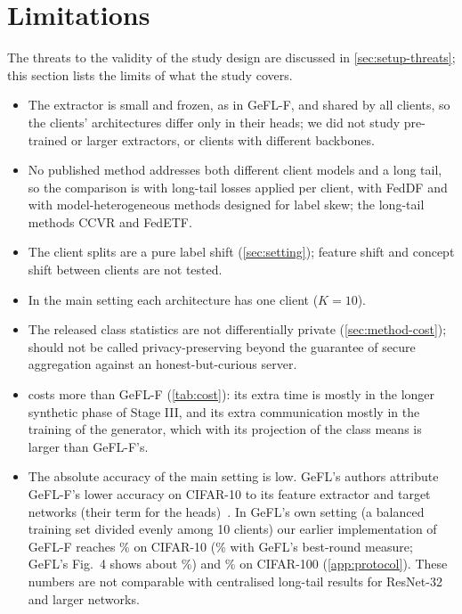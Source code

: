 \section{Limitations}\label{sec:discussion}

The threats to the validity of the study design are discussed in \cref{sec:setup-threats}; this section lists the
limits of what the study covers.
\begin{itemize}
\item The extractor is small and frozen, as in GeFL-F, and shared by all clients, so the clients' architectures
differ only in their heads; we did not study pre-trained or larger extractors, or clients with different backbones.
\item No published method addresses both different client models and a long tail, so the comparison is with
long-tail losses applied per client, with FedDF and with model-heterogeneous methods designed for label skew; the
long-tail methods CCVR and FedETF.
\item The client splits are a pure label shift (\cref{sec:setting}); feature shift and concept shift between clients
are not tested.
\item In the main setting each architecture has one client ($K=10$).
\item The released class statistics are not differentially private (\cref{sec:method-cost}); \ours should not be
called privacy-preserving beyond the guarantee of secure aggregation against an honest-but-curious server.
\item \ours costs more than GeFL-F (\cref{tab:cost}): its extra time is mostly in the longer synthetic phase of
Stage III, and its extra communication mostly in the training of the generator, which with its projection of the
class means is larger than GeFL-F's.
\item The absolute accuracy of the main setting is low. GeFL's authors attribute GeFL-F's lower accuracy on CIFAR-10
to its feature extractor and target networks (their term for the heads)~\cite{kang2025gefl}. In GeFL's own setting
(a balanced training set divided evenly among 10 clients) our earlier implementation of GeFL-F reaches
\% on CIFAR-10 (\% with GeFL's best-round measure;
GeFL's Fig.~4 shows about \%) and \% on CIFAR-100
(\cref{app:protocol}). These numbers are not comparable with
centralised long-tail results for ResNet-32 and larger networks.
\end{itemize}

